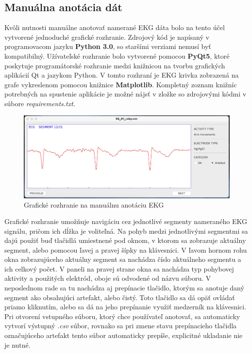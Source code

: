 \subsection{Manuálna anotácia dát}

Kvôli nutnosti manuálne anotovať namerané EKG dáta bolo na tento účel vytvorené jednoduché grafické rozhranie. Zdrojový kód je napísaný v programovacom jazyku \textbf{Python 3.0}, so staršími verziami nemusí byť kompatibilný. Užívateľské rozhranie bolo vytvorené pomocou \textbf{PyQt5}, ktoré poskytuje programátorské rozhranie medzi knižnicou na tvorbu grafických aplikácií Qt a jazykom Python. V tomto rozhraní je EKG krivka zobrazená na grafe vykreslenom pomocou knižnice \textbf{Matplotlib}. Kompletný zoznam knižníc potrebných na spustenie aplikácie je možné nájsť v zložke so zdrojovými kódmi v súbore \textit{requirements.txt}.

\begin{figure}[H]
    \centering
    \includegraphics[scale=0.225]{img/annotation_sw.jpeg}
    \caption{Grafické rozhranie na manuálnu anotáciu EKG}
    \label{fig:SW_labels}
\end{figure}

Grafické rozhranie umožňuje navigáciu cez jednotlivé segmenty nameraného EKG signálu, pričom ich dĺžka je voliteľná. Na pohyb medzi jednotlivými segmentmi sa dajú použiť buď tlačidlá umiestnené pod oknom, v ktorom sa zobrazuje aktuálny segment, alebo pomocou ľavej a pravej šípky na klávesnici. V ľavom hornom rohu okna zobrazujúceho aktuálny segment sa nachádza číslo aktuálneho segmentu a ich celkový počet. V paneli na pravej strane okna sa nachádza typ pohybovej aktivity a použitých elektród, oboje sú odvodené od názvu súboru. V neposlednom rade sa tu nachádza aj prepínacie tlačidlo, ktorým sa anotuje daný segment ako obsahujúci artefakt, alebo čistý. Toto tlačidlo sa dá opäť ovládať priamo kliknutím, alebo sa dá na jeho prepínanie využiť medzerník na klávesnici. Pri otvorení vstupného súboru, ktorý chce používateľ anotovať, sa automaticky vytvorí výstupný \textit{.csv} súbor, rovnako sa pri zmene stavu prepínacieho tlačidla označujúceho artefakt tento súbor automaticky prepíše, explicitné ukladanie nie je nutné. 


